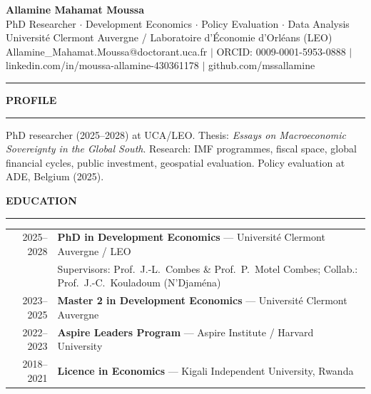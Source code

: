 \documentclass[10pt,a4paper]{article}
\newcommand{\cvsection}[1]{%
  \vspace{4pt}\noindent%
  {\footnotesize\bfseries\color{navy}\MakeUppercase{#1}}%
  \par\nointerlineskip\vspace{0.5pt}%
  {\color{gold}\rule{\linewidth}{0.65pt}}%
  \par\vspace{1.5pt}%
}
\begin{document}
\begin{center}
  {\large\bfseries\color{navy} Allamine Mahamat Moussa}\\[1pt]
  {\footnotesize\color{mgray}
    PhD Researcher $\cdot$ Development Economics $\cdot$
    Policy Evaluation $\cdot$ Data Analysis}\\[0.5pt]
  {\footnotesize
    Universit\'{e} Clermont Auvergne / Laboratoire d'\'Economie d'Orl\'eans (LEO)}\\[0.5pt]
  {\footnotesize\color{mgray}
    Allamine\_Mahamat.Moussa@doctorant.uca.fr \;$|$\; ORCID: 0009-0001-5953-0888
    \;$|$\; linkedin.com/in/moussa-allamine-430361178 \;$|$\; github.com/mssallamine}
\end{center}
\vspace{0.5pt}
{\color{gold}\rule{\linewidth}{0.9pt}}
\vspace{1.5pt}

\cvsection{Profile}
{\footnotesize
PhD researcher (2025--2028) at UCA/LEO. Thesis: \textit{Essays on Macroeconomic Sovereignty
in the Global South}. Research: IMF programmes, fiscal space, global financial cycles,
public investment, geospatial evaluation. Policy evaluation at ADE, Belgium (2025).
}

\cvsection{Education}
{\footnotesize
\begin{tabularx}{\linewidth}{@{} D X @{}}
2025--2028 &
  \textbf{PhD in Development Economics} --- Universit\'{e} Clermont Auvergne / LEO\\
  & Supervisors: Prof.\ J.-L.\ Combes \& Prof.\ P.\ Motel Combes;
    Collab.: Prof.\ J.-C.\ Kouladoum (N'Djam\'{e}na)\\[0.5pt]
2023--2025 &
  \textbf{Master 2 in Development Economics} --- Universit\'{e} Clermont Auvergne\\[0.5pt]
2022--2023 &
  \textbf{Aspire Leaders Program} --- Aspire Institute / Harvard University\\[0.5pt]
2018--2021 &
  \textbf{Licence in Economics} --- Kigali Independent University, Rwanda\\
\end{tabularx}
}
\end{document}
